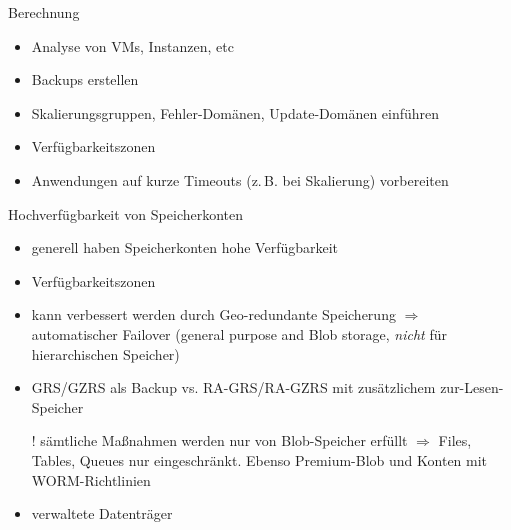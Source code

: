 \begin{flashcard}[]{Berechnung}
  \begin{itemize}
    \item Analyse von VMs, Instanzen, etc
    \item Backups erstellen
    \item Skalierungsgruppen, Fehler-Domänen, Update-Domänen einführen
    \item Verfügbarkeitszonen
    \item Anwendungen auf kurze Timeouts (z.\,B. bei Skalierung) vorbereiten
  \end{itemize}
\end{flashcard}


\begin{flashcard}[]{Hochverfügbarkeit von Speicherkonten}
  \begin{itemize}
    \item generell haben Speicherkonten hohe Verfügbarkeit
    \item Verfügbarkeitszonen
    \item kann verbessert werden durch Geo-redundante Speicherung\newline
      $\Rightarrow$ automatischer Failover (general purpose and Blob storage, \emph{nicht} für hierarchischen Speicher)
    \item GRS/GZRS als Backup vs. RA-GRS/RA-GZRS mit zusätzlichem zur-Lesen-Speicher
    \item[!] sämtliche Maßnahmen werden nur von Blob-Speicher erfüllt\newline
      $\Rightarrow$ Files, Tables, Queues nur eingeschränkt. Ebenso Premium-Blob und Konten mit WORM-Richtlinien
    \item verwaltete Datenträger
  \end{itemize}
\end{flashcard}
